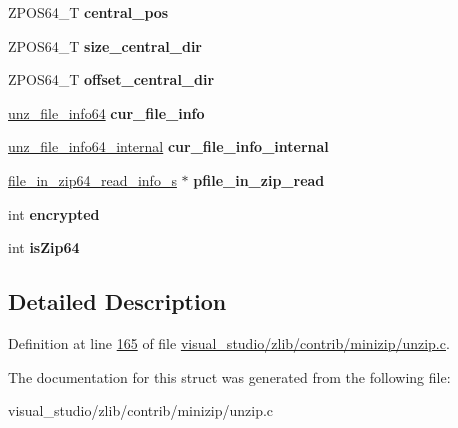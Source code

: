 \begin{DoxyCompactItemize}
Z\+P\+O\+S64\+\_\+T {\bfseries central\+\_\+pos}
\item 
\mbox{\label{structunz64__s_ac20ff22a6956f082e88204c72d4fdda1}} 
Z\+P\+O\+S64\+\_\+T {\bfseries size\+\_\+central\+\_\+dir}
\item 
\mbox{\label{structunz64__s_abef1ed5574b24559f6601268aa0d44aa}} 
Z\+P\+O\+S64\+\_\+T {\bfseries offset\+\_\+central\+\_\+dir}
\item 
\mbox{\label{structunz64__s_a2c0f02f769c43e2c351e310ff130f1c0}} 
\hyperlink{structunz__file__info64__s}{unz\+\_\+file\+\_\+info64} {\bfseries cur\+\_\+file\+\_\+info}
\item 
\mbox{\label{structunz64__s_aaf5f19b9e41e86ccde7a2d7802622bf6}} 
\hyperlink{structunz__file__info64__internal__s}{unz\+\_\+file\+\_\+info64\+\_\+internal} {\bfseries cur\+\_\+file\+\_\+info\+\_\+internal}
\item 
\mbox{\label{structunz64__s_a7c8696d8ccf96593e13cda7288fb9b2a}} 
\hyperlink{structfile__in__zip64__read__info__s}{file\+\_\+in\+\_\+zip64\+\_\+read\+\_\+info\+\_\+s} $\ast$ {\bfseries pfile\+\_\+in\+\_\+zip\+\_\+read}
\item 
\mbox{\label{structunz64__s_ae1c0c073c67b119d6ba21ea2678ea513}} 
int {\bfseries encrypted}
\item 
\mbox{\label{structunz64__s_afd7f9f28081943e01294bc4bf6f36e7b}} 
int {\bfseries is\+Zip64}
\end{DoxyCompactItemize}


\subsection{Detailed Description}


Definition at line \hyperlink{visual__studio_2zlib_2contrib_2minizip_2unzip_8c_source_l00165}{165} of file \hyperlink{visual__studio_2zlib_2contrib_2minizip_2unzip_8c_source}{visual\+\_\+studio/zlib/contrib/minizip/unzip.\+c}.



The documentation for this struct was generated from the following file\+:\begin{DoxyCompactItemize}
\item 
visual\+\_\+studio/zlib/contrib/minizip/unzip.\+c\end{DoxyCompactItemize}
